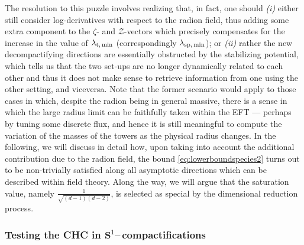 The resolution to this puzzle involves realizing that, in fact, one should \emph{(i)} either still consider log-derivatives with respect to the radion field, thus adding some extra component to the $\zeta$- and $\mathcal{Z}$-vectors which precisely compensates for the increase in the value of $\lambda_{\rm t,\, min}$ (correspondingly $\lambda_{\rm sp,\, min}$); or \emph{(ii)} rather the new decompactifying directions 
are essentially obstructed by the stabilizing potential, which tells us that the two set-ups are no longer dynamically related to each other and thus it does not make sense to retrieve information from one using the other setting, and viceversa. Note that the former scenario would apply to those cases in which, despite the radion being in general massive, there is a sense in which the large radius limit can be faithfully taken within the EFT --- perhaps by tuning some discrete flux, and hence it is still meaningful to compute the variation of the masses of the towers as the physical radius changes. In the following, we will discuss in detail how, upon taking into account the additional contribution due to the radion field, the bound \eqref{eq:lowerboundspecies2} turns out to be non-trivially satisfied along all asymptotic directions which can be described within field theory. Along the way, we will argue that the saturation value, namely $\frac{1}{\sqrt{(d-1)(d-2)}}$, is selected as special by the dimensional reduction process.


\subsubsection{Testing the CHC in $\mathbf{S}^1$--\,compactifications}

